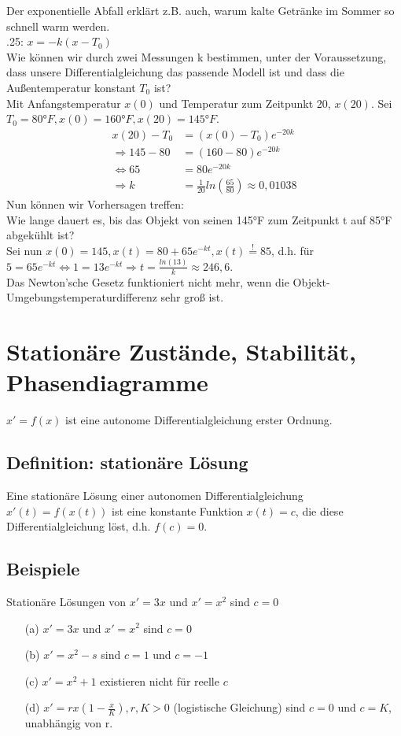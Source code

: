 \documentclass[12pt,a4paper]{article}
\newcommand{\DGL}{Differentialgleichung }
\begin{document}
Der exponentielle Abfall erklärt z.B. auch, warum kalte Getränke im Sommer so schnell warm werden. \\ .25: 
$x = -k(x-T_0)$ \\
Wie können wir durch zwei Messungen k bestimmen, unter der Voraussetzung, dass unsere \DGL das passende Modell ist und dass die Außentemperatur konstant $T_0$ ist? \\
Mit Anfangstemperatur $x(0)$ und Temperatur zum Zeitpunkt 20, $x(20)$. Sei $T_0=80\text{°}F, x(0) = 160\text{°}F, x(20) = 145\text{°}F$. \\
\begin{align*}
x(20) - T_0 &= (x(0)-T_0)e^{-20k} \\
\Rightarrow 145-80&=(160-80)e^{-20k} \\
\Leftrightarrow 65 &= 80e^{-20k} \\
\Rightarrow k&=\frac{1}{20} ln(\frac{65}{80}) \approx 0,01038
\end{align*}
Nun können wir Vorhersagen treffen: \\
Wie lange dauert es, bis das Objekt von seinen 145°F zum Zeitpunkt t auf 85°F abgekühlt ist? \\
Sei nun $x(0) = 145, x(t) = 80+65e^{-kt}, x(t) \overset{!}{=} 85$, d.h. für $5=65e^{-kt} \Leftrightarrow 1=13e^{-kt} \Rightarrow t = \frac{ln(13)}{k} \approx 246,6.$ \\
Das Newton'sche Gesetz funktioniert nicht mehr, wenn die Objekt-Umgebungstemperaturdifferenz sehr groß ist.
\section{Stationäre Zustände, Stabilität, Phasendiagramme}
$x'=f(x)$ ist eine autonome \DGL erster Ordnung.
\subsection{Definition: stationäre Lösung}
Eine stationäre Lösung einer autonomen \DGL $x'(t) = f(x(t))$ ist eine konstante Funktion $x(t) = c$, die diese \DGL löst, d.h. $f(c) = 0$.
\subsection{Beispiele}
Stationäre Lösungen von $x'=3x$ und $x'=x^2$ sind $c=0$
\begin{itemize}
\item[(a)] $x'=3x$ und $x'=x^2$ sind $c=0$
\item[(b)] $x'=x^2-s$ sind $c=1$ und $c=-1$
\item[(c)] $x'=x^2+1$ existieren nicht für reelle $c$
\item[(d)] $x'=rx(1-\frac{x}{K}), r,K > 0$ (logistische Gleichung) sind $c=0$ und $c=K$, unabhängig von r.
\end{itemize}
\end{document}

